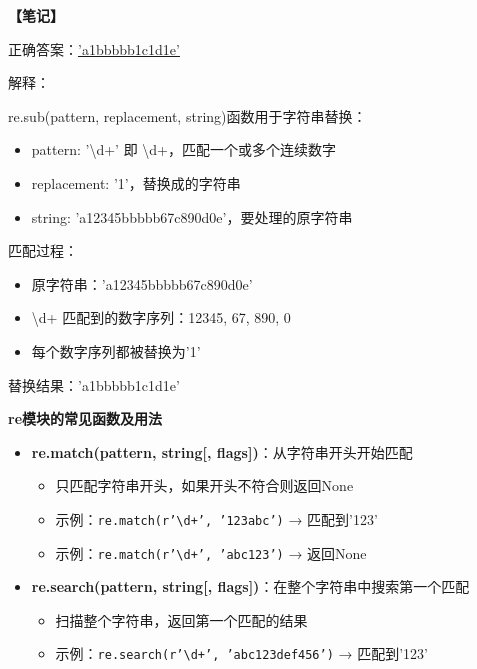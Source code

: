 \begin{mdframed}[linewidth=1pt, linecolor=black]

  \textbf{\color{red}【笔记】}

  正确答案：\underline{'a1bbbbb1c1d1e'}

  解释：

  \qquad re.sub(pattern, replacement, string)函数用于字符串替换：
  \begin{itemize}
    \item pattern: '\textbackslash d+' 即 \textbackslash d+，匹配一个或多个连续数字
    \item replacement: '1'，替换成的字符串
    \item string: 'a12345bbbbb67c890d0e'，要处理的原字符串
  \end{itemize}

  \qquad 匹配过程：
  \begin{itemize}
    \item 原字符串：'a12345bbbbb67c890d0e'
    \item \textbackslash d+ 匹配到的数字序列：12345, 67, 890, 0
    \item 每个数字序列都被替换为'1'
  \end{itemize}

  \qquad 替换结果：'a1bbbbb1c1d1e'

  \textbf{re模块的常见函数及用法}

  \begin{itemize}
    \item \textbf{re.match(pattern, string[, flags])}：从字符串开头开始匹配
      \begin{itemize}
        \item 只匹配字符串开头，如果开头不符合则返回None
        \item 示例：\texttt{re.match(r'\textbackslash d+', '123abc')} → 匹配到'123'
        \item 示例：\texttt{re.match(r'\textbackslash d+', 'abc123')} → 返回None
      \end{itemize}

    \item \textbf{re.search(pattern, string[, flags])}：在整个字符串中搜索第一个匹配
      \begin{itemize}
        \item 扫描整个字符串，返回第一个匹配的结果
        \item 示例：\texttt{re.search(r'\textbackslash d+', 'abc123def456')} → 匹配到'123'
      \end{itemize}


\end{itemize}
\end{mdframed}
